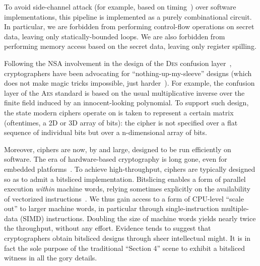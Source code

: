 \documentclass[draft,english]{jflart}
\newcommand{\AES}{\textsc{Aes}}
\newcommand{\DES}{\textsc{Des}}
\begin{document}

To avoid side-channel attack (for example, based on
timing~\citep{bernstein:timing-attack-AES}) over software
implementations, this pipeline is implemented as a purely
combinational circuit. In particular, we are forbidden from performing
control-flow operations on secret data, leaving only
statically-bounded loops. We are also forbidden from performing memory
access based on the secret data, leaving only register spilling.


Following the NSA involvement in the design of the \DES{} confusion
layer~\citep{johnson:cold-war-crypto}, cryptographers have been
advocating for ``nothing-up-my-sleeve'' designs (which does not make
magic tricks impossible, just
harder~\citep{bernstein:something-up-my-sleeves}). For example, the
confusion layer of the \AES{} standard is based on the usual
multiplicative inverse over the finite field induced by an
innocent-looking polynomial. To support such design, the state modern
ciphers operate on is taken to represent a certain matrix
(oftentimes, a 2D or 3D array of bits): the cipher is not specified
over a flat sequence of individual bits but over a n-dimensional array
of bits.


Moreover, ciphers are now, by and large, designed to be run
efficiently on software. The era of hardware-based cryptography is
long gone, even for embedded
platforms~\citep{buchanan:nist-lightweight-crypto}. To achieve
high-throughput, ciphers are typically designed so as to admit a
bitsliced implementation. Bitslicing enables a form of parallel
execution \emph{within} machine words, relying sometimes explicitly on
the availability of vectorized instructions~\citep{beaulieu:speck,
  bernstein:chacha}. We thus gain access to a form of CPU-level
``scale out'' to larger machine words, in particular through
single-instruction multiple-data (SIMD) instructions. Doubling the
size of machine words yields nearly twice the throughput, without any
effort. Evidence tends to suggest that cryptographers obtain bitsliced
designs through sheer intellectual might. It is in fact the sole
purpose of the traditional ``Section 4'' scene to exhibit a bitsliced
witness in all the gory details.
\end{document}
